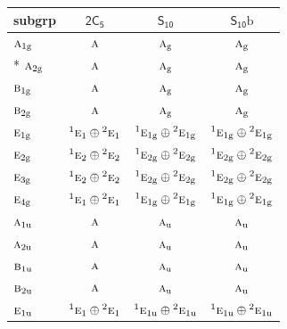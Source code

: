 \documentclass[10pt,a4paper]{article}
\numberwithin{equation}{section}
\newcommand{\grp}[1]{\mathsf{#1}}
\newcommand{\irr}[1]{\text{\normalfont\scshape #1}}
\newcommand{\conjpair}[1]{{}^{#1}}
\newcommand{\ptag}[1]{\mathrm{#1}}
\newcommand{\secondclass}{\mathrm{b}}
\begin{document}
{\small\begin{longtable}{@{}lccc@{}}\toprule
subgrp & \href{2C5.pdf}{$\grp{2C_{5}}$} & \href{S10.pdf}{$\grp{S_{10}}$} & \href{S10b.pdf}{$\grp{S_{10}}\secondclass$}\\\midrule\endhead
\bottomrule\endfoot\endlastfoot
$\irr{a}_{1\ptag{g}}$ & $\irr{a}$ & $\irr{a}_{\ptag{g}}$ & $\irr{a}_{\ptag{g}}$\\*
$\irr{a}_{2\ptag{g}}$ & $\irr{a}$ & $\irr{a}_{\ptag{g}}$ & $\irr{a}_{\ptag{g}}$\\
$\irr{b}_{1\ptag{g}}$ & $\irr{a}$ & $\irr{a}_{\ptag{g}}$ & $\irr{a}_{\ptag{g}}$\\
$\irr{b}_{2\ptag{g}}$ & $\irr{a}$ & $\irr{a}_{\ptag{g}}$ & $\irr{a}_{\ptag{g}}$\\
$\irr{e}_{1\ptag{g}}$ & $\conjpair{1}\irr{e}_{1}\oplus \conjpair{2}\irr{e}_{1}$ & $\conjpair{1}\irr{e}_{1\ptag{g}}\oplus \conjpair{2}\irr{e}_{1\ptag{g}}$ & $\conjpair{1}\irr{e}_{1\ptag{g}}\oplus \conjpair{2}\irr{e}_{1\ptag{g}}$\\
$\irr{e}_{2\ptag{g}}$ & $\conjpair{1}\irr{e}_{2}\oplus \conjpair{2}\irr{e}_{2}$ & $\conjpair{1}\irr{e}_{2\ptag{g}}\oplus \conjpair{2}\irr{e}_{2\ptag{g}}$ & $\conjpair{1}\irr{e}_{2\ptag{g}}\oplus \conjpair{2}\irr{e}_{2\ptag{g}}$\\
$\irr{e}_{3\ptag{g}}$ & $\conjpair{1}\irr{e}_{2}\oplus \conjpair{2}\irr{e}_{2}$ & $\conjpair{1}\irr{e}_{2\ptag{g}}\oplus \conjpair{2}\irr{e}_{2\ptag{g}}$ & $\conjpair{1}\irr{e}_{2\ptag{g}}\oplus \conjpair{2}\irr{e}_{2\ptag{g}}$\\
$\irr{e}_{4\ptag{g}}$ & $\conjpair{1}\irr{e}_{1}\oplus \conjpair{2}\irr{e}_{1}$ & $\conjpair{1}\irr{e}_{1\ptag{g}}\oplus \conjpair{2}\irr{e}_{1\ptag{g}}$ & $\conjpair{1}\irr{e}_{1\ptag{g}}\oplus \conjpair{2}\irr{e}_{1\ptag{g}}$\\
$\irr{a}_{1\ptag{u}}$ & $\irr{a}$ & $\irr{a}_{\ptag{u}}$ & $\irr{a}_{\ptag{u}}$\\
$\irr{a}_{2\ptag{u}}$ & $\irr{a}$ & $\irr{a}_{\ptag{u}}$ & $\irr{a}_{\ptag{u}}$\\
$\irr{b}_{1\ptag{u}}$ & $\irr{a}$ & $\irr{a}_{\ptag{u}}$ & $\irr{a}_{\ptag{u}}$\\
$\irr{b}_{2\ptag{u}}$ & $\irr{a}$ & $\irr{a}_{\ptag{u}}$ & $\irr{a}_{\ptag{u}}$\\
$\irr{e}_{1\ptag{u}}$ & $\conjpair{1}\irr{e}_{1}\oplus \conjpair{2}\irr{e}_{1}$ & $\conjpair{1}\irr{e}_{1\ptag{u}}\oplus \conjpair{2}\irr{e}_{1\ptag{u}}$ & $\conjpair{1}\irr{e}_{1\ptag{u}}\oplus \conjpair{2}\irr{e}_{1\ptag{u}}$\\

\end{longtable}}
\end{document}
